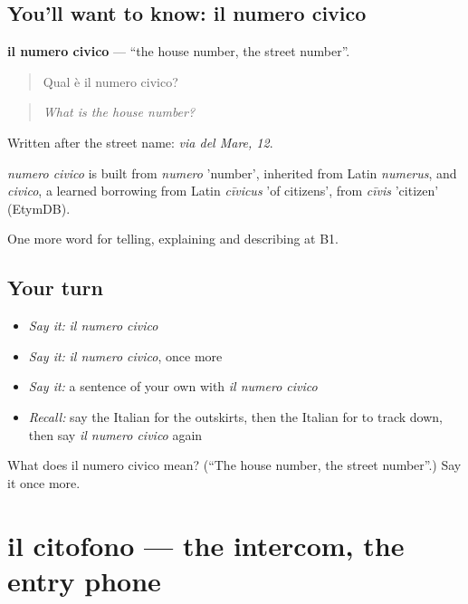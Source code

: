 \subsection*{You'll want to know: il numero civico}
\textbf{il numero civico} — \textquotedblleft{}the house number, the street number\textquotedblright{}.

\begin{quote}
Qual è il numero civico?
\end{quote}

\begin{quote}
\emph{What is the house number?}
\end{quote}

Written after the street name: \emph{via del Mare, 12}.

\begin{cousinweb}
\emph{numero civico} is built from \emph{numero} 'number', inherited from Latin \emph{numerus}, and \emph{civico}, a learned borrowing from Latin \emph{cīvicus} 'of citizens', from \emph{cīvis} 'citizen' (EtymDB).
\end{cousinweb}

\begin{grammarlens}[title={What you've built}]
One more word for telling, explaining and describing at B1.
\end{grammarlens}

\subsection*{Your turn}
\begin{itemize}
\raggedright
  \item \emph{Say it:} \emph{il numero civico}
  \item \emph{Say it:} \emph{il numero civico}, once more
  \item \emph{Say it:} a sentence of your own with \emph{il numero civico}
  \item \emph{Recall:} say the Italian for the outskirts, then the Italian for to track down, then say \emph{il numero civico} again
\end{itemize}

\begin{tcolorbox}[breakable,colback=teal!4,colframe=teal!35!black,title={Before you move on}]
What does il numero civico mean? (\textquotedblleft{}The house number, the street number\textquotedblright{}.) Say it once more.
\end{tcolorbox}
\section[il citofono]{il citofono — the intercom, the entry phone}

